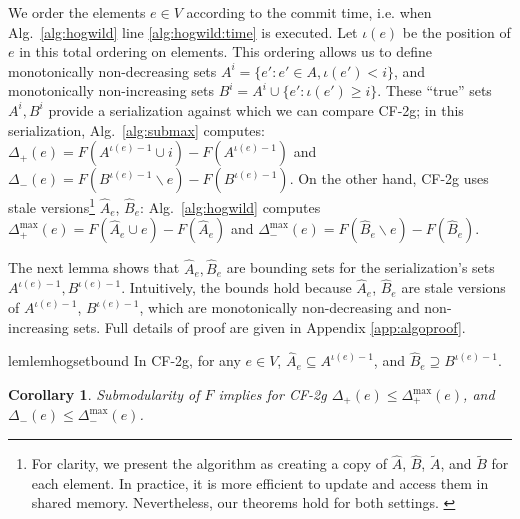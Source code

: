 \documentclass{article} %
\newcommand{\hogwild}{CF-2g}
\newtheorem{cor}[thm]{Corollary}
\newcommand{\algref}[1]{Alg.~\ref{#1}}
\begin{document}
We order the elements $e \in V$ according to the commit time, i.e. when \algref{alg:hogwild} line \ref{alg:hogwild:time} is executed.
Let $\iota(e)$ be the position of $e$ in this total ordering on elements.
This ordering allows us to define monotonically non-decreasing sets $A^i = \{e' : e' \in A, \iota(e') < i\}$, and monotonically non-increasing sets $B^i = A^i \cup \{e': \iota(e') \geq i\}$.
These ``true'' sets $A^i, B^i$ provide a serialization against which we can compare \hogwild{}; in this serialization, \algref{alg:submax} computes:
$\Delta_{+}       (e) = F(A^{\iota(e)-1}\cup i) - F(A^{\iota(e)-1})$
and
$\Delta_{-}       (e) = F(B^{\iota(e)-1}\backslash e) - F(B^{\iota(e)-1})$.
On the other hand, \hogwild{} uses stale versions\footnote{
  For clarity, we present the algorithm as creating a copy of $\hat{A}$, $\hat{B}$, $\tilde{A}$, and $\tilde{B}$ for each element. In practice, it is more efficient to update and access them in shared memory. Nevertheless, our theorems hold for both settings.
  \label{fn:copyvsshared}
}
$\hat{A}_e$, $\hat{B}_e$:
\algref{alg:hogwild} computes
$\Delta_{+}^{\max}(e) = F(\hat{A}_e\cup e) - F(\hat{A}_e)$
and
$\Delta_{-}^{\max}(e) = F(\hat{B}_e\backslash e) - F(\hat{B}_e)$.

The next lemma shows that $\hat{A}_e, \hat{B}_e$ are bounding sets for the serialization's sets $A^{\iota(e)-1}, B^{\iota(e)-1}$.
Intuitively, the bounds hold because $\hat{A}_e$, $\hat{B}_e$ are stale versions of $A^{\iota(e)-1}$, $B^{\iota(e)-1}$, which are monotonically non-decreasing and non-increasing sets.
Full details of proof are given in Appendix \ref{app:algoproof}.

\begin{restatable}{lem}{lemhogsetbound}\label{lem:hog:set_bound}
In \hogwild{}, for any $e\in V$, $\hat{A}_e \subseteq A^{\iota(e)-1}$, and $\hat{B}_e \supseteq B^{\iota(e)-1}$.
\end{restatable}

\begin{cor}\label{cor:hog:delta_bound}
Submodularity of $F$ implies for \hogwild{}
$\Delta_{+}(e) \leq \Delta_{+}^{\max}(e)$, and
$\Delta_{-}(e) \leq \Delta_{-}^{\max}(e)$.
\end{cor}
\end{document}
